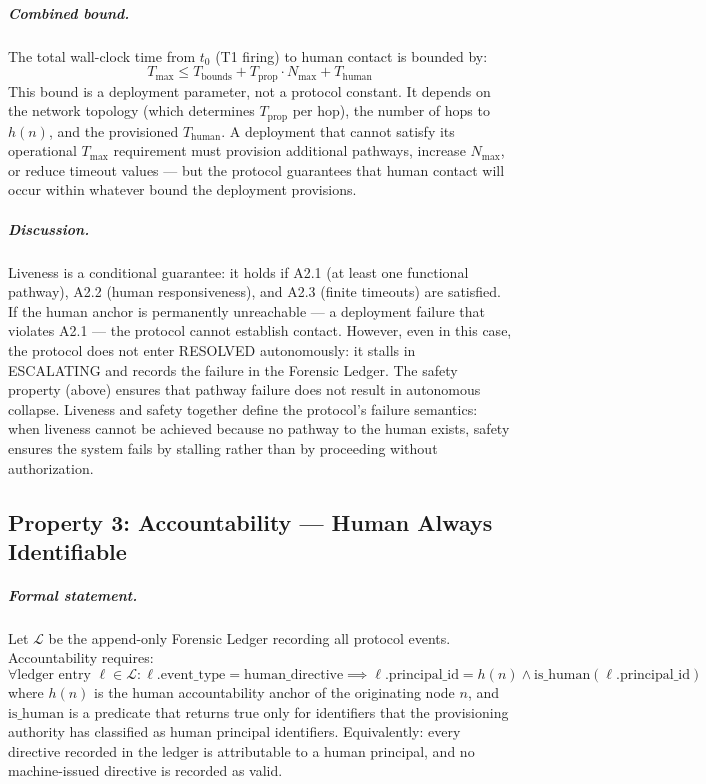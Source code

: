 \subparagraph{Combined bound.} The total wall-clock time from $t_0$ (T1 firing) to human contact is bounded by:
\begin{equation}
T_{\max} \leq T_{\text{bounds}} + T_{\text{prop}} \cdot N_{\max} + T_{\text{human}}
\end{equation}
This bound is a deployment parameter, not a protocol constant. It depends on the network topology (which determines $T_{\text{prop}}$ per hop), the number of hops to $h(n)$, and the provisioned $T_{\text{human}}$. A deployment that cannot satisfy its operational $T_{\max}$ requirement must provision additional pathways, increase $N_{\max}$, or reduce timeout values — but the protocol guarantees that human contact will occur within whatever bound the deployment provisions.

\subparagraph{Discussion.} Liveness is a conditional guarantee: it holds if A2.1 (at least one functional pathway), A2.2 (human responsiveness), and A2.3 (finite timeouts) are satisfied. If the human anchor is permanently unreachable — a deployment failure that violates A2.1 — the protocol cannot establish contact. However, even in this case, the protocol does not enter RESOLVED autonomously: it stalls in ESCALATING and records the failure in the Forensic Ledger. The safety property (above) ensures that pathway failure does not result in autonomous collapse. Liveness and safety together define the protocol's failure semantics: when liveness cannot be achieved because no pathway to the human exists, safety ensures the system fails by stalling rather than by proceeding without authorization.

\subsection{Property 3: Accountability — Human Always Identifiable}


\subparagraph{Formal statement.} Let $\mathcal{L}$ be the append-only Forensic Ledger recording all protocol events. Accountability requires:
\begin{equation}
\forall \text{ledger entry } \ell \in \mathcal{L} : \ell.\text{event\_type} = \text{human\_directive} \implies \ell.\text{principal\_id} = h(n) \land \text{is\_human}(\ell.\text{principal\_id})
\end{equation}
where $h(n)$ is the human accountability anchor of the originating node $n$, and $\text{is\_human}$ is a predicate that returns true only for identifiers that the provisioning authority has classified as human principal identifiers. Equivalently: every directive recorded in the ledger is attributable to a human principal, and no machine-issued directive is recorded as valid.

